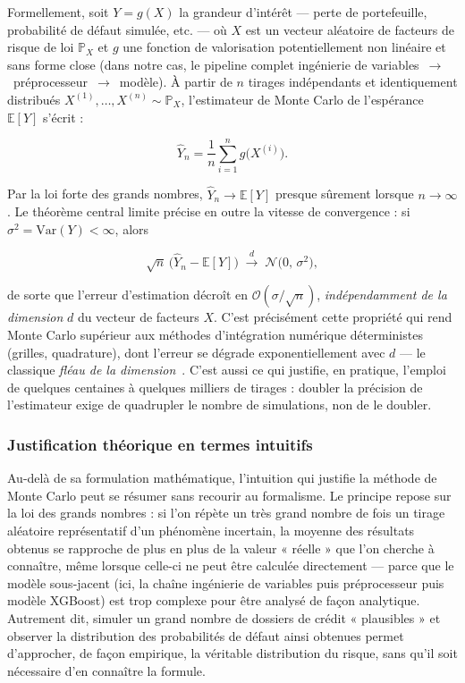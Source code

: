 \documentclass[a4paper,12pt,oneside]{report}
\begin{document}
Formellement, soit $Y = g(X)$ la grandeur d'intérêt — perte de portefeuille, probabilité de
défaut simulée, etc. — où $X$ est un vecteur aléatoire de facteurs de risque de loi $\mathbb{P}_X$
et $g$ une fonction de valorisation potentiellement non linéaire et sans forme close (dans notre
cas, le pipeline complet ingénierie de variables~$\to$~préprocesseur~$\to$~modèle). À partir de
$n$ tirages indépendants et identiquement distribués $X^{(1)}, \dots, X^{(n)} \sim \mathbb{P}_X$,
l'estimateur de Monte Carlo de l'espérance $\mathbb{E}[Y]$ s'écrit :

\begin{equation}
  \hat{Y}_n = \frac{1}{n} \sum_{i=1}^{n} g\big(X^{(i)}\big).
  \label{eq:mc-estimator}
\end{equation}

Par la loi forte des grands nombres, $\hat{Y}_n \to \mathbb{E}[Y]$ presque sûrement lorsque
$n \to \infty$. Le théorème central limite précise en outre la vitesse de convergence : si
$\sigma^2 = \mathrm{Var}(Y) < \infty$, alors

\begin{equation}
  \sqrt{n}\,\big(\hat{Y}_n - \mathbb{E}[Y]\big) \;\xrightarrow{\ d\ }\; \mathcal{N}\big(0,\, \sigma^2\big),
  \label{eq:mc-clt}
\end{equation}

de sorte que l'erreur d'estimation décroît en $\mathcal{O}(\sigma / \sqrt{n})$, \emph{indépendamment
de la dimension} $d$ du vecteur de facteurs $X$. C'est précisément cette propriété qui rend Monte
Carlo supérieur aux méthodes d'intégration numérique déterministes (grilles, quadrature), dont
l'erreur se dégrade exponentiellement avec $d$ — le classique \textit{fléau de la
dimension}~\cite{glasserman2004}. C'est aussi ce qui justifie, en pratique, l'emploi de quelques
centaines à quelques milliers de tirages : doubler la précision de l'estimateur exige de
quadrupler le nombre de simulations, non de le doubler.

\subsubsection{Justification théorique en termes intuitifs}

Au-delà de sa formulation mathématique, l'intuition qui justifie la méthode de Monte Carlo peut
se résumer sans recourir au formalisme. Le principe repose sur la loi des grands nombres : si
l'on répète un très grand nombre de fois un tirage aléatoire représentatif d'un phénomène
incertain, la moyenne des résultats obtenus se rapproche de plus en plus de la valeur « réelle »
que l'on cherche à connaître, même lorsque celle-ci ne peut être calculée directement — parce
que le modèle sous-jacent (ici, la chaîne ingénierie de variables puis préprocesseur puis
modèle XGBoost) est trop complexe pour être analysé de façon analytique. Autrement dit, simuler
un grand nombre de dossiers de crédit « plausibles » et observer la distribution des
probabilités de défaut ainsi obtenues permet d'approcher, de façon empirique, la véritable
distribution du risque, sans qu'il soit nécessaire d'en connaître la formule.
\end{document}
